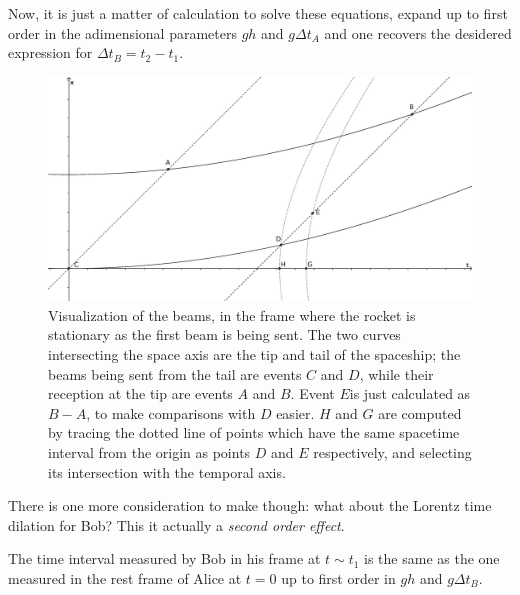 \documentclass[main.tex]{subfiles}
\begin{document}
Now, it is just a matter of calculation to solve these equations, expand up to first order in the adimensional parameters \(gh\) and \(g \Delta t_A\) and one recovers the desidered expression for  \(\Delta t_B = t_2 - t_1\).

\begin{figure}[h]
  \centering
  \includegraphics[width=\textwidth]{figures/Visualization_of_accelerational_time_dilation.eps}
  \caption{Visualization of the beams, in the frame where the rocket is stationary as the first beam is being sent. The two curves intersecting the space axis are the tip and tail of the spaceship; the beams being sent from the tail are events \(C\) and \(D\), while their reception at the tip are events \(A\) and \(B\). Event \(E\)is just calculated as \(B-A\), to make comparisons with \(D\) easier. \(H\) and \(G\) are computed by tracing the dotted line of points which have the same spacetime interval from the origin as points \(D\) and \(E\) respectively, and selecting its intersection with the temporal axis.}
  \label{fig:beam-visualization}
\end{figure}

There is one more consideration to make though: what about the Lorentz time dilation for Bob? This it actually a \emph{second order effect}.

\begin{claim}
The time interval measured by Bob in his frame at \(t \sim t_1\) is the same as the one measured in the rest frame of Alice at \(t=0\) up to first order in \(gh\) and \(g \Delta t_B\).
\end{claim}
\end{document}
